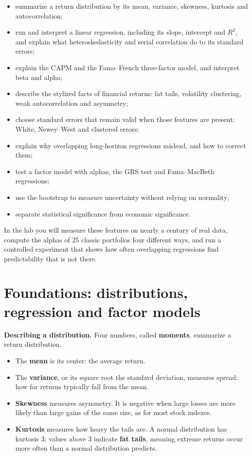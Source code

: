\begin{itemize}
  \item summarize a return distribution by its mean, variance, skewness, kurtosis and autocorrelation;
  \item run and interpret a linear regression, including its slope, intercept and $R^2$, and explain what heteroskedasticity and serial correlation do to its standard errors;
  \item explain the CAPM and the Fama--French three-factor model, and interpret beta and alpha;
  \item describe the stylized facts of financial returns: fat tails, volatility clustering, weak autocorrelation and asymmetry;
  \item choose standard errors that remain valid when those features are present: White, Newey--West and clustered errors;
  \item explain why overlapping long-horizon regressions mislead, and how to correct them;
  \item test a factor model with alphas, the GRS test and Fama--MacBeth regressions;
  \item use the bootstrap to measure uncertainty without relying on normality;
  \item separate statistical significance from economic significance.
\end{itemize}

In the lab you will measure these features on nearly a century of real data, compute the alphas of 25 classic portfolios four different ways, and run a controlled experiment that shows how often overlapping regressions find predictability that is not there.

\section{Foundations: distributions, regression and factor models}
\label{sec:03-foundations}

\textbf{Describing a distribution.} Four numbers, called \textbf{moments}, summarize a return distribution.

\begin{itemize}
  \item The \textbf{mean} is its center: the average return.
  \item The \textbf{variance}, or its square root the standard deviation, measures spread: how far returns typically fall from the mean.
  \item \textbf{Skewness} measures asymmetry. It is negative when large losses are more likely than large gains of the same size, as for most stock indexes.
  \item \textbf{Kurtosis} measures how heavy the tails are. A normal distribution has kurtosis 3; values above 3 indicate \textbf{fat tails}, meaning extreme returns occur more often than a normal distribution predicts.
\end{itemize}

